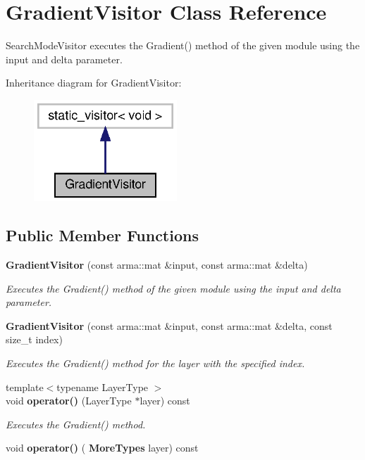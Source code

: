 \section{Gradient\+Visitor Class Reference}
\label{classmlpack_1_1ann_1_1GradientVisitor}


Search\+Mode\+Visitor executes the Gradient() method of the given module using the input and delta parameter.  




Inheritance diagram for Gradient\+Visitor\+:
\nopagebreak
\begin{figure}[H]
\begin{center}
\leavevmode
\includegraphics[width=152pt]{classmlpack_1_1ann_1_1GradientVisitor__inherit__graph}
\end{center}
\end{figure}
\subsection*{Public Member Functions}
\begin{DoxyCompactItemize}
\item 
\textbf{ Gradient\+Visitor} (const arma\+::mat \&input, const arma\+::mat \&delta)
\begin{DoxyCompactList}\small\item\em Executes the Gradient() method of the given module using the input and delta parameter. \end{DoxyCompactList}\item 
\textbf{ Gradient\+Visitor} (const arma\+::mat \&input, const arma\+::mat \&delta, const size\+\_\+t index)
\begin{DoxyCompactList}\small\item\em Executes the Gradient() method for the layer with the specified index. \end{DoxyCompactList}\item 
{\footnotesize template$<$typename Layer\+Type $>$ }\\void \textbf{ operator()} (Layer\+Type $\ast$layer) const
\begin{DoxyCompactList}\small\item\em Executes the Gradient() method. \end{DoxyCompactList}\item 
void \textbf{ operator()} (\textbf{ More\+Types} layer) const
\end{DoxyCompactItemize}



